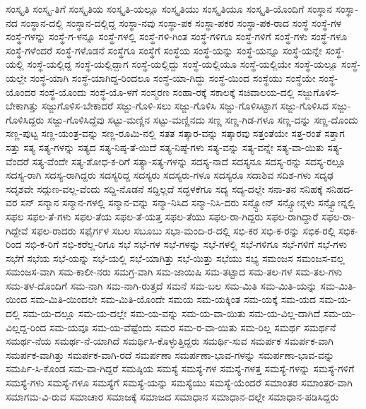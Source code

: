 {ಸಂಸ್ಕೃತಿ
ಸಂಸ್ಕೃ-ತಿಗೆ
ಸಂಸ್ಕೃತಿಯ
ಸಂಸ್ಕೃತಿ-ಯಲ್ಲೂ
ಸಂಸ್ಕೃತಿಯು
ಸಂಸ್ಕೃತಿಯೂ
ಸಂಸ್ಕೃತಿ-ಯೊಂದಿಗೆ
ಸಂಸ್ಥಾನ
ಸಂಸ್ಥಾ-ನದ
ಸಂಸ್ಥಾನ-ದಲ್ಲಿ
ಸಂಸ್ಥಾನ-ದಲ್ಲಿದ್ದ
ಸಂಸ್ಥಾ-ನವು
ಸಂಸ್ಥಾ-ಪಕ
ಸಂಸ್ಥಾ-ಪಕರ
ಸಂಸ್ಥಾ-ಪಕ-ರಾದ
ಸಂಸ್ಥೆ
ಸಂಸ್ಥೆ-ಗಳ
ಸಂಸ್ಥೆ-ಗಳನ್ನು
ಸಂಸ್ಥೆ-ಗ-ಳನ್ನೂ
ಸಂಸ್ಥೆ-ಗಳಲ್ಲಿ
ಸಂಸ್ಥೆ-ಗಳಿ-ಗಿಂತ
ಸಂಸ್ಥೆ-ಗಳಿಗೂ
ಸಂಸ್ಥೆ-ಗಳಿಗೆ
ಸಂಸ್ಥೆ-ಗಳು
ಸಂಸ್ಥೆ-ಗಳೂ
ಸಂಸ್ಥೆ-ಗಳೆಂದರೆ
ಸಂಸ್ಥೆ-ಗಳೊಡನೆ
ಸಂಸ್ಥೆಗೂ
ಸಂಸ್ಥೆಗೆ
ಸಂಸ್ಥೆಯ
ಸಂಸ್ಥೆ-ಯನ್ನು
ಸಂಸ್ಥೆ-ಯನ್ನೂ
ಸಂಸ್ಥೆ-ಯನ್ನೇ
ಸಂಸ್ಥೆ-ಯಲ್ಲಿ
ಸಂಸ್ಥೆ-ಯಲ್ಲಿದ್ದ
ಸಂಸ್ಥೆ-ಯಲ್ಲಿದ್ದಾಗ
ಸಂಸ್ಥೆ-ಯಲ್ಲಿದ್ದು
ಸಂಸ್ಥೆ-ಯಲ್ಲಿಯೂ
ಸಂಸ್ಥೆ-ಯಲ್ಲಿಯೇ
ಸಂಸ್ಥೆ-ಯಲ್ಲೂ
ಸಂಸ್ಥೆ-ಯಲ್ಲೇ
ಸಂಸ್ಥೆ-ಯಾಗಿ
ಸಂಸ್ಥೆ-ಯಾಗಿದ್ದ-ರಿಂದಲೂ
ಸಂಸ್ಥೆ-ಯಾ-ಗಿದ್ದು
ಸಂಸ್ಥೆ-ಯಿಂದ
ಸಂಸ್ಥೆಯು
ಸಂಸ್ಥೆಯೇ
ಸಂಸ್ಥೆ-ಯೊಂದರ
ಸಂಸ್ಥೆ-ಯೊಂದು
ಸಂಸ್ಥೆ-ಯೊ-ಳಗೆ
ಸಂಸ್ಮರಣ
ಸಂಹಾ-ರಕ್ಕೆ
ಸಕಾಲಕ್ಕೆ
ಸಚಿವಾಲಯ-ದಲ್ಲಿ
ಸಜ್ಜುಗೊಳಿಸ-ಬೇಕಾಗಿತ್ತು
ಸಜ್ಜುಗೊಳಿಸ-ಬೇಕಾದರೆ
ಸಜ್ಜು-ಗೊಳಿ-ಸಲು
ಸಜ್ಜು-ಗೊಳಿಸಿ
ಸಜ್ಜು-ಗೊಳಿಸಿಟ್ಟಾಗ
ಸಜ್ಜು-ಗೊಳಿಸಿದ
ಸಜ್ಜು-ಗೊಳಿಸಿದ್ದರು
ಸಜ್ಜು-ಗೊಳಿಸಿದ್ದೆವು
ಸಟ್ಟು-ಮಣ್ಣಿನ
ಸಟ್ಟು-ಮಣ್ಣಿನದು
ಸಣ್ಣ
ಸಣ್ಣ-ಗಿಡ-ಗಳೂ
ಸಣ್ಣ-ದನ್ನು
ಸಣ್ಣ-ದೊಂದು
ಸಣ್ಣ-ಪುಟ್ಟ
ಸಣ್ಣ-ಯಂತ್ರ-ವನ್ನು
ಸಣ್ಣ-ರೂಮಿ-ನಲ್ಲಿ
ಸತತ
ಸತ್ಕಾರ-ವನ್ನು
ಸತ್ಕಾರವು
ಸತ್ತಂತೆಯೇ
ಸತ್ತ-ರಂತೆ
ಸತ್ತಾಗ
ಸತ್ತು
ಸತ್ಯ
ಸತ್ಯ-ಗಳನ್ನು
ಸತ್ಯದ
ಸತ್ಯ-ನಿಷ್ಠ-ತೆ-ಯಿದೆ
ಸತ್ಯ-ನಿಷ್ಠೆ-ಗಳು
ಸತ್ಯ-ವನ್ನು
ಸತ್ಯ-ವನ್ನೇ
ಸತ್ಯ-ವಾ-ಯಿತು
ಸತ್ಯ-ವೆಂದರೆ
ಸತ್ಯ-ವೆಂದೇ
ಸತ್ಯ-ಶೋಧ-ಕ-ರಿಗೆ
ಸತ್ಯಾ-ಸತ್ಯ-ಗಳನ್ನು
ಸದಸ್ಯ-ನಾದೆ
ಸದಸ್ಯನೂ
ಸದಸ್ಯ-ರನ್ನು
ಸದಸ್ಯ-ರಲ್ಲೂ
ಸದಸ್ಯ-ರಾಗಿ
ಸದಸ್ಯ-ರಾಗಿದ್ದರು
ಸದಸ್ಯರಿದ್ದ
ಸದಸ್ಯರು
ಸದಸ್ಯರು-ಗಳೂ
ಸದಸ್ಯರೂ
ಸದಾಶಿವ
ಸದಿಶ-ಗಳು
ಸದೃಢ
ಸದೃಶವೇ
ಸದ್ಗುಣ-ವಲ್ಲ-ವೆಂದು
ಸದ್ದಿ-ನೊಡನೆ
ಸದ್ದಿಲ್ಲದೆ
ಸದ್ಭಳಕೆಗೂ
ಸದ್ಯ
ಸದ್ಯ-ದಲ್ಲೇ
ಸನಾ-ತನ
ಸನಿಹಕ್ಕೆ
ಸನಿಹದ-ವರ
ಸನ್
ಸನ್ಮಾನ
ಸನ್ಮಾನ-ಗಳಲ್ಲಿ
ಸನ್ಮಾನ-ವನ್ನು
ಸನ್ಮಾ-ನಿಸಿದ
ಸನ್ಮಾ-ನಿಸಿ-ದರು
ಸನ್ಸ್ಟೋನ್
ಸನ್ಸ್ಟೋನ್ಗಳು
ಸನ್ಸ್ಟೋನ್ನಲ್ಲಿ
ಸಫಲ
ಸಫಲ-ತೆ-ಗಳು
ಸಫಲ-ತೆಯ
ಸಫಲ-ತೆ-ಯತ್ತ
ಸಫಲ-ತೆಯು
ಸಫಲ-ರಾ-ಗಿದ್ದರು
ಸಫಲ-ರಾಗಿದ್ದಾರೆ
ಸಫಲ-ರಾ-ಗಿದ್ದೇವೆ
ಸಫಲ-ರಾದರು
ಸಫೈರ್ಗಳ
ಸಬಲ
ಸಬೂಬು
ಸಭಾ-ಮಂದಿ-ರ-ದಲ್ಲಿ
ಸಭಿ-ಕರ
ಸಭಿ-ಕ-ರನ್ನು
ಸಭಿಕ-ರಲ್ಲಿ
ಸಭಿಕ-ರಿಂದ
ಸಭಿ-ಕ-ರಿಗೆ
ಸಭಿ-ಕರೆಲ್ಲ-ರಿಗೂ
ಸಭೆ
ಸಭೆ-ಗಳ
ಸಭೆ-ಗಳನ್ನು
ಸಭೆ-ಗಳಲ್ಲಿ
ಸಭೆ-ಗಳಿಗೂ
ಸಭೆ-ಗಳಿಗೆ
ಸಭೆ-ಗಳು
ಸಭೆಗೆ
ಸಭೆಯ
ಸಭೆ-ಯನ್ನು
ಸಭೆ-ಯಲ್ಲಿ
ಸಭೆ-ಯಾಗಿತ್ತು
ಸಭೆ-ಯಿತ್ತು
ಸಭೆಯು
ಸಭ್ಯ
ಸಮಂಜಸ
ಸಮಂಜಸ-ವಲ್ಲ
ಸಮಂಜಸ-ವಾಗಿ
ಸಮ-ಕಾಲೀ-ನರು
ಸಮಗ್ರ-ವಾಗಿ
ಸಮ-ಜಾಯಿಷಿ
ಸಮ-ತಟ್ಟಾದ
ಸಮ-ತಲ-ಗಳ
ಸಮ-ತಲ-ಗಳು
ಸಮ-ತಳ-ದೊಂದಿಗೆ
ಸಮ-ನಾಗಿ
ಸಮ-ನಾಗಿ-ರುತ್ತದೆ
ಸಮನೆ
ಸಮ-ಬಲ
ಸಮ-ಮಿತಿ
ಸಮ-ಮಿತಿ-ಯನ್ನು
ಸಮ-ಮಿತಿ-ಯಿಂದ
ಸಮ-ಮಿತಿ-ಯಿಂದಲೇ
ಸಮ-ಮಿತಿ-ಯೊಂದೇ
ಸಮಯ
ಸಮ-ಯಕ್ಕಿಂತ
ಸಮ-ಯಕ್ಕೆ
ಸಮ-ಯದ
ಸಮ-ಯ-ದಲ್ಲಿ
ಸಮ-ಯ-ದಲ್ಲೂ
ಸಮ-ಯ-ದಲ್ಲೇ
ಸಮ-ಯ-ವನ್ನು
ಸಮ-ಯ-ವಾ-ಯಿತು
ಸಮ-ಯ-ವಿಲ್ಲ-ದಾಗಿದೆ
ಸಮ-ಯ-ವಿಲ್ಲದ್ದ-ರಿಂದ
ಸಮ-ಯವೂ
ಸಮ-ಯ-ವೆಷ್ಟೆಂದು
ಸಮರ
ಸಮ-ರ-ವಾ-ಯಿತು
ಸಮ-ರಿಲ್ಲ
ಸಮರ್ಥ
ಸಮರ್ಥನೆ
ಸಮರ್ಥ-ನೆಯ
ಸಮರ್ಥ-ನೆ-ಯಾಗಿದೆ
ಸಮರ್ಥಿಸಿ-ಕೊಳ್ಳುತ್ತಿದ್ದರು
ಸಮರ್ಥಿ-ಸುವ
ಸಮರ್ಪಕ
ಸಮರ್ಪಕ-ವಾಗಿ
ಸಮರ್ಪಕ-ವಾಗಿತ್ತು
ಸಮರ್ಪಕ-ವಾಗಿ-ರದೆ
ಸಮರ್ಪಣಾ
ಸಮರ್ಪಣಾ-ಭಾವ-ಗಳನ್ನು
ಸಮರ್ಪಣಾ-ಭಾವ-ವನ್ನು
ಸಮರ್ಪಿ-ಸಿ-ಕೊಂಡ
ಸಮ-ವಾ-ಗಿದ್ದರೆ
ಸಮಷ್ಠಿಯ
ಸಮಸ್ಯೆ
ಸಮಸ್ಯೆ-ಗಳ
ಸಮಸ್ಯೆ-ಗಳತ್ತ
ಸಮಸ್ಯೆ-ಗಳನ್ನು
ಸಮಸ್ಯೆ-ಗಳಿಗೆ
ಸಮಸ್ಯೆ-ಗಳು
ಸಮಸ್ಯೆ-ಗಳೂ
ಸಮಸ್ಯೆಗೆ
ಸಮಸ್ಯೆ-ಯನ್ನು
ಸಮಸ್ಯೆಯು
ಸಮಸ್ಯೆ-ಯೆಂದರೆ
ಸಮಾಂತರ
ಸಮಾಂತರ-ವಾಗಿ
ಸಮಾಗಮ-ವಿ-ರುವ
ಸಮಾಚಾರ
ಸಮಾಜಕ್ಕೆ
ಸಮಾಜದ
ಸಮಾಧಾನ
ಸಮಾಧಾನ-ದಲ್ಲೇ
ಸಮಾಧಾನ-ಪಡಿಸಿದ್ದರು
}
